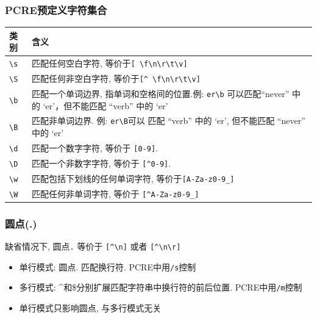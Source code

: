 \documentclass[compress]{beamer}
\begin{document}
\begin{frame}[fragile]
\frametitle{PCRE预定义字符集合}

\footnotesize

\begin{tabular}{|l|p{8cm}|}\hline

类别 & 含义 \\ \hline\hline

\verb=\s= & 匹配任何空白字符, 等价于\verb*=[ \f\n\r\t\v]= \\
\hline

\verb=\S= & 匹配任何非空白字符, 等价于\verb*=[^ \f\n\r\t\v]= \\
\hline

\verb=\b= & 匹配一个单词边界, 指单词和空格间的位置.例:
{\verb=er\b=} 可以匹配``never'' 中的 `er'，但不能匹配 ``verb'' 中的 `er'\\
\hline

\verb=\B= & 匹配非单词边界. 例: {\verb=er\B=}可以
匹配 ``verb'' 中的 `er', 但不能匹配 ``never'' 中的 `er' \\ \hline

\verb=\d= & 匹配一个数字字符, 等价于 \verb=[0-9]=. \\ \hline

\verb=\D= & 匹配一个非数字字符, 等价于 \verb=[^0-9]=. \\ \hline

\verb=\w= & 匹配包括下划线的任何单词字符,
等价于\verb=[A-Za-z0-9_]= \\ \hline

\verb=\W= & 匹配任何非单词字符, 等价于 \verb=[^A-Za-z0-9_]= \\
\hline

\end{tabular}
\end{frame}

\begin{frame}[fragile]
\frametitle{圆点(.)}

缺省情况下, 圆点{\verb=.=} 等价于
{\verb=[^\n]=} 或者 {\verb=[^\n\r]=}
\begin{itemize}

\item 单行模式: 圆点{.} 匹配换行符. PCRE中用{\verb=/s=}控制
\item 多行模式: {\textasciicircum}和{\$}分别扩展匹配字符串中换行符的前后位置.
PCRE中用{\verb=/m=}控制
\item 单行模式只影响圆点, 与多行模式无关
\end{itemize}
\end{frame}
\end{document}
